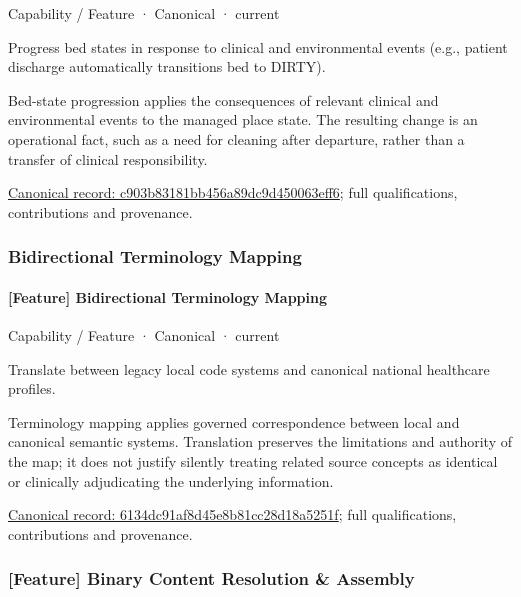 \label{element:c903b83181bb456a89dc9d450063eff6}
{\small Capability / Feature · Canonical · current}\par

Progress bed states in response to clinical and environmental events (e.g., patient discharge automatically transitions bed to DIRTY).



Bed-state progression applies the consequences of relevant clinical and environmental events to the managed place state. The resulting change is an operational fact, such as a need for cleaning after departure, rather than a transfer of clinical responsibility.


{\footnotesize \href{../../../../continuum/strategy/capability/feature/c903b83181bb456a89dc9d450063eff6.md}{Canonical record: c903b83181bb456a89dc9d450063eff6}; full qualifications, contributions and provenance.}\par
\subsubsection{Bidirectional Terminology Mapping}

\paragraph{[Feature] Bidirectional Terminology Mapping}

\label{element:6134dc91af8d45e8b81cc28d18a5251f}
{\small Capability / Feature · Canonical · current}\par

Translate between legacy local code systems and canonical national healthcare profiles.



Terminology mapping applies governed correspondence between local and canonical semantic systems. Translation preserves the limitations and authority of the map; it does not justify silently treating related source concepts as identical or clinically adjudicating the underlying information.


{\footnotesize \href{../../../../continuum/strategy/capability/feature/6134dc91af8d45e8b81cc28d18a5251f.md}{Canonical record: 6134dc91af8d45e8b81cc28d18a5251f}; full qualifications, contributions and provenance.}\par
\subsubsection{[Feature] Binary Content Resolution \& Assembly}

